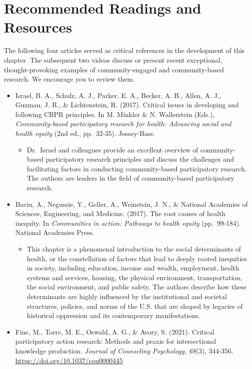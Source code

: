 \documentclass[
  11pt,
]{book}
\providecommand{\tightlist}{%
  \setlength{\itemsep}{0pt}\setlength{\parskip}{0pt}}
\begin{document}
\hypertarget{recommended-readings-and-resources}{%
\section{Recommended Readings and Resources}\label{recommended-readings-and-resources}}

The following four articles served as critical references in the development of this chapter. The subsequent two videos discuss or present recent exceptional, thought-provoking examples of community-engaged and community-based research. We encourage you to review them.

\begin{itemize}
\tightlist
\item
  Israel, B. A., Schulz, A. J., Parker, E. A., Becker, A. B., Allen, A. J., Guzman, J. R., \& Lichtenstein, R. (2017). Critical issues in developing and following CBPR principles. In M. Minkler \& N. Wallerstein (Eds.), \emph{Community-based participatory research for health: Advancing social and health equity} (2nd ed., pp.~32-35). Jossey-Bass.

  \begin{itemize}
  \tightlist
  \item
    Dr.~Israel and colleagues provide an excellent overview of community-based participatory research principles and discuss the challenges and facilitating factors in conducting community-based participatory research. The authors are leaders in the field of community-based participatory research.
  \end{itemize}
\item
  Baciu, A., Negussie, Y., Geller, A., Weinstein, J. N., \& National Academies of Sciences, Engineering, and Medicine. (2017). The root causes of health inequity. In \emph{Communities in action: Pathways to health equity} (pp.~99-184). National Academies Press.

  \begin{itemize}
  \tightlist
  \item
    This chapter is a phenomenal introduction to the social determinants of health, or the constellation of factors that lead to deeply rooted inequities in society, including education, income and wealth, employment, health systems and services, housing, the physical environment, transportation, the social environment, and public safety. The authors describe how these determinants are highly influenced by the institutional and societal structures, policies, and norms of the U.S. that are shaped by legacies of historical oppression and its contemporary manifestations.
  \end{itemize}
\item
  Fine, M., Torre, M. E., Oswald, A. G., \& Avory, S. (2021). Critical participatory action research: Methods and praxis for intersectional knowledge production. \emph{Journal of Counseling Psychology, 68}(3), 344-356. \url{https://doi.org/10.1037/cou0000445}


\end{itemize}
\end{document}
